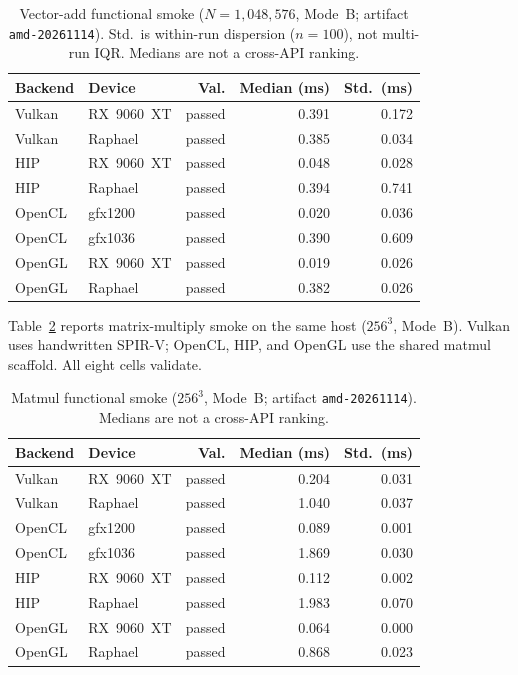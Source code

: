 \documentclass[11pt,a4paper]{article}
\begin{document}
\begin{table}[t]
\centering
\small
\begin{tabular}{@{}llrrr@{}}
\toprule
Backend & Device & Val. & Median (ms) & Std.\ (ms) \\
\midrule
Vulkan & RX~9060~XT & passed & 0.391 & 0.172 \\
Vulkan & Raphael    & passed & 0.385 & 0.034 \\
HIP    & RX~9060~XT & passed & 0.048 & 0.028 \\
HIP    & Raphael    & passed & 0.394 & 0.741 \\
OpenCL & gfx1200    & passed & 0.020 & 0.036 \\
OpenCL & gfx1036    & passed & 0.390 & 0.609 \\
OpenGL & RX~9060~XT & passed & 0.019 & 0.026 \\
OpenGL & Raphael    & passed & 0.382 & 0.026 \\
\bottomrule
\end{tabular}
\caption{Vector-add functional smoke ($N=1{,}048{,}576$, Mode~B;
artifact \texttt{amd-20261114}).
Std.\ is within-run dispersion ($n{=}100$), not multi-run IQR.
Medians are not a cross-API ranking.}
\label{tab:smoke}
\end{table}

Table~\ref{tab:matmul} reports matrix-multiply smoke on the same host
($256^3$, Mode~B). Vulkan uses handwritten SPIR-V; OpenCL, HIP, and OpenGL
use the shared matmul scaffold. All eight cells validate.

\begin{table}[t]
\centering
\small
\begin{tabular}{@{}llrrr@{}}
\toprule
Backend & Device & Val. & Median (ms) & Std.\ (ms) \\
\midrule
Vulkan & RX~9060~XT & passed & 0.204 & 0.031 \\
Vulkan & Raphael    & passed & 1.040 & 0.037 \\
OpenCL & gfx1200    & passed & 0.089 & 0.001 \\
OpenCL & gfx1036    & passed & 1.869 & 0.030 \\
HIP    & RX~9060~XT & passed & 0.112 & 0.002 \\
HIP    & Raphael    & passed & 1.983 & 0.070 \\
OpenGL & RX~9060~XT & passed & 0.064 & 0.000 \\
OpenGL & Raphael    & passed & 0.868 & 0.023 \\
\bottomrule
\end{tabular}
\caption{Matmul functional smoke ($256^3$, Mode~B;
artifact \texttt{amd-20261114}). Medians are not a cross-API ranking.}
\label{tab:matmul}
\end{table}
\end{document}
